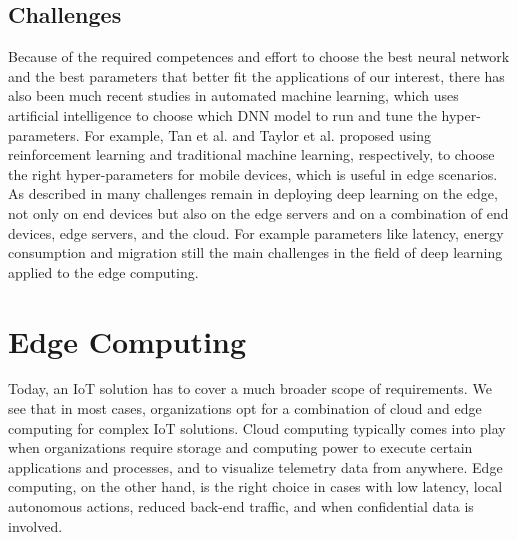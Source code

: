 \subsection{Challenges}
Because of the required competences and effort to choose the best neural network and the best parameters that better fit the applications of our interest, there has also been much recent studies in automated machine learning, which uses artificial intelligence to choose which DNN model to run and tune the hyper-parameters. 
For example, Tan et al. \cite{tan2018mnasnet} and Taylor et al. \cite{taylor2018adaptive} proposed using reinforcement learning and traditional machine learning, respectively, to choose the right hyper-parameters for mobile devices, which is useful in edge scenarios.
As described in \cite{deepedgerev} many challenges remain in deploying deep learning on the edge, not only on end devices but also on the edge servers and on a combination of end devices, edge servers, and the cloud. For example parameters like latency, energy consumption and migration still the main challenges in the field of deep learning applied to the edge computing.



\section{Edge Computing}
Today, an IoT solution has to cover a much broader scope of requirements. We see that in most cases, organizations opt for a combination of cloud and edge computing for complex IoT solutions. Cloud computing typically comes into play when organizations require storage and computing power to execute certain applications and processes, and to visualize telemetry data from anywhere. Edge computing, on the other hand, is the right choice in cases with low latency, local autonomous actions, reduced back-end traffic, and when confidential data is involved.

